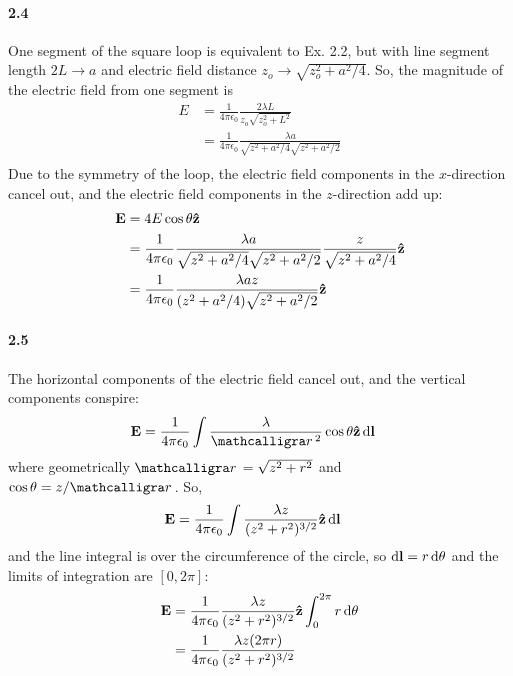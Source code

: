 \documentclass[../main.tex]{subfiles}
\begin{document}
\paragraph{2.4}
One segment of the square loop is equivalent to Ex. 2.2, but with line segment length $2L \to a$
and electric field distance $z_o \to \sqrt{z_o^2 + a^2/4}$. So, the magnitude of the electric field
from one segment is
\begin{align*}
    E &= \frac{1}{4\pi\epsilon_0} \frac{2\lambda L}{z_o \sqrt{z_o^2 + L^2}} \\
    &= \frac{1}{4\pi\epsilon_0} \frac{\lambda a}{\sqrt{z^2 + a^2/4} \sqrt{z^2 + a^2/2}}  \\
\end{align*}
Due to the symmetry of the loop, the electric field components in the $x$-direction cancel out,
and the electric field components in the $z$-direction add up:
\begin{align*}
    \vb{E} &= 4 E \cos{\theta} \vu{z} \\
    &= \frac{1}{4\pi\epsilon_0} \frac{\lambda a}{\sqrt{z^2 + a^2/4} \sqrt{z^2 + a^2/2}} 
        \frac{z}{\sqrt{z^2 + a^2/4}} \vu{z} \\
    &= \frac{1}{4\pi\epsilon_0} \frac{\lambda a z}{(z^2 + a^2/4) \sqrt{z^2 + a^2/2}} \vu{z}
\end{align*}

\paragraph{2.5}
The horizontal components of the electric field cancel out, and the vertical components conspire:
\begin{align*}
    \vb{E} &= \frac{1}{4\pi\epsilon_0}
        \int \frac{\lambda}{\scriptr^2} \cos\theta \vu{z} \dd{\vb{l}}
\end{align*}
where geometrically $\scriptr = \sqrt{z^2 + r^2}$ and $\cos\theta = z / \scriptr$. So,
\begin{align*}
    \vb{E} &= \frac{1}{4\pi\epsilon_0}
        \int \frac{\lambda z}{(z^2 + r^2)^{3/2}} \vu{z} \dd{\vb{l}}
\end{align*}
and the line integral is over the circumference of the circle, so $\dd{\vb{l}} = r \dd{\theta}$ and
the limits of integration are $[0, 2\pi]$:
\begin{align*}
    \vb{E} &= \frac{1}{4\pi\epsilon_0} \frac{\lambda z}{(z^2 + r^2)^{3/2}} \vu{z}
        \int_0^{2\pi}  r \dd{\theta} \\
    &= \frac{1}{4\pi\epsilon_0}
        \frac{\lambda z (2\pi r)}{(z^2 + r^2)^{3/2}}
\end{align*}
\end{document}
